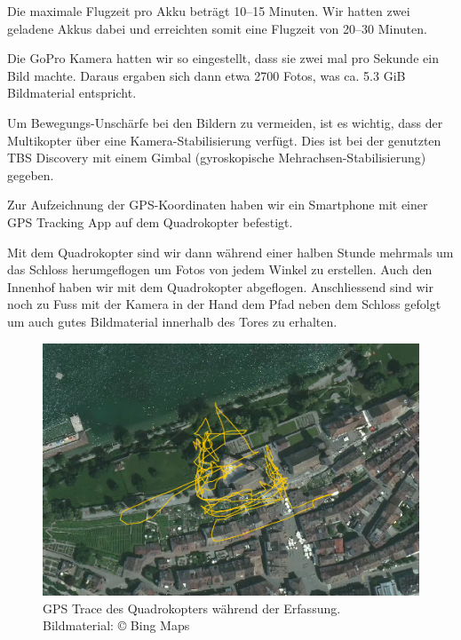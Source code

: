 Die maximale Flugzeit pro Akku beträgt 10--15 Minuten. Wir hatten zwei geladene
Akkus dabei und erreichten somit eine Flugzeit von 20--30 Minuten.

Die GoPro Kamera hatten wir so eingestellt, dass sie zwei mal pro Sekunde ein
Bild machte. Daraus ergaben sich dann etwa 2700 Fotos, was ca. 5.3 GiB
Bildmaterial entspricht.

Um Bewegungs-Unschärfe bei den Bildern zu vermeiden, ist es wichtig, dass der
Multikopter über eine Kamera-Stabilisierung verfügt. Dies ist bei der genutzten
TBS Discovery mit einem Gimbal (gyroskopische Mehrachsen-Stabilisierung)
gegeben.

Zur Aufzeichnung der GPS-Koordinaten haben wir ein Smartphone mit einer GPS
Tracking App auf dem Quadrokopter befestigt.

Mit dem Quadrokopter sind wir dann während einer halben Stunde mehrmals um das
Schloss herumgeflogen um Fotos von jedem Winkel zu erstellen. Auch den Innenhof
haben wir mit dem Quadrokopter abgeflogen. Anschliessend sind wir noch zu Fuss
mit der Kamera in der Hand dem Pfad neben dem Schloss gefolgt um auch gutes
Bildmaterial innerhalb des Tores zu erhalten.

\vspace{1\baselineskip}

\begin{figure}[H]
	\centering
	\includegraphics[width=\textwidth]{images/gpstrace_satellite.png}
	\caption{GPS Trace des Quadrokopters während der Erfassung.\\Bildmaterial:
		\copyright{} Bing Maps}
	\label{img:gpstrace-satellite}
\end{figure}

